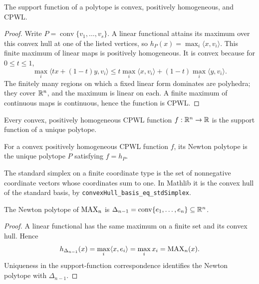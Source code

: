 \begin{lemma}
  \label{lem:support-function-properties}
  The support function of a polytope is convex, positively homogeneous, and
  CPWL.
\end{lemma}
\begin{proof}
  Write $P=\operatorname{conv}\{v_1,\ldots,v_s\}$.  A linear functional
  attains its maximum over this convex hull at one of the listed vertices, so
  $h_P(x)=\max_i\langle x,v_i\rangle$.  This finite maximum of linear maps is
  positively homogeneous.  It is convex because for $0\leq t\leq1$,
  \[
  \max_i\langle tx+(1-t)y,v_i\rangle
  \leq t\max_i\langle x,v_i\rangle+(1-t)\max_i\langle y,v_i\rangle.
  \]
  The finitely many regions on which a fixed linear form dominates are
  polyhedra; they cover $\mathbb{R}^n$, and the maximum is linear on each.  A finite
  maximum of continuous maps is continuous, hence the function is CPWL.
\end{proof}

\begin{theorem}
  \label{thm:support-polytope-correspondence}
  \notready
  Every convex, positively homogeneous CPWL function $f:\mathbb{R}^n\to\mathbb{R}$ is the
  support function of a unique polytope.
\end{theorem}

\begin{definition}
  \label{def:newton-polytope}
  For a convex positively homogeneous CPWL function $f$, its Newton polytope
  is the unique polytope $P$ satisfying $f=h_P$.
\end{definition}

\begin{definition}
  \label{def:standard-simplex}
  \mathlibok
  The standard simplex on a finite coordinate type is the set of nonnegative
  coordinate vectors whose coordinates sum to one.  In Mathlib it is the
  convex hull of the standard basis, by
  \texttt{convexHull\_basis\_eq\_stdSimplex}.
\end{definition}

\begin{lemma}
  \label{lem:max-newton-simplex}
  The Newton polytope of $\operatorname{MAX}_n$ is
  $\Delta_{n-1}=\operatorname{conv}\{e_1,\ldots,e_n\}\subseteq\mathbb{R}^n$.
\end{lemma}
\begin{proof}
  A linear functional has the same maximum on a finite set and its convex
  hull.  Hence
  \[
    h_{\Delta_{n-1}}(x)=\max_i\langle x,e_i\rangle=\max_i x_i=\operatorname{MAX}_n(x).
  \]
  Uniqueness in the support-function correspondence identifies the Newton
  polytope with $\Delta_{n-1}$.
\end{proof}

